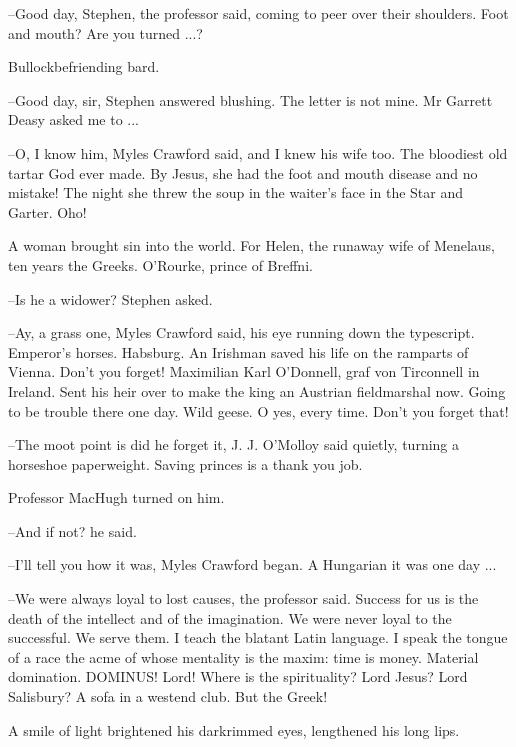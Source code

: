 --Good day, Stephen, the professor said, coming to peer over their
shoulders. Foot and mouth? Are you turned ...?

Bullockbefriending bard.



--Good day, sir, Stephen answered blushing. The letter is not mine. Mr
Garrett Deasy asked me to ...

--O, I know him, Myles Crawford said, and I knew his wife too. The
bloodiest old tartar God ever made. By Jesus, she had the foot and mouth
disease and no mistake! The night she threw the soup in the waiter's face
in the Star and Garter. Oho!

A woman brought sin into the world. For Helen, the runaway wife of
Menelaus, ten years the Greeks. O'Rourke, prince of Breffni.

--Is he a widower? Stephen asked.

--Ay, a grass one, Myles Crawford said, his eye running down the
typescript. Emperor's horses. Habsburg. An Irishman saved his life on the
ramparts of Vienna. Don't you forget! Maximilian Karl O'Donnell, graf
von Tirconnell in Ireland. Sent his heir over to make the king an Austrian
fieldmarshal now. Going to be trouble there one day. Wild geese. O yes,
every time. Don't you forget that!

--The moot point is did he forget it, J. J. O'Molloy said quietly,
turning a horseshoe paperweight. Saving princes is a thank you job.

Professor MacHugh turned on him.

--And if not? he said.

--I'll tell you how it was, Myles Crawford began. A Hungarian it was one
day ...



--We were always loyal to lost causes, the professor said. Success for us
is the death of the intellect and of the imagination. We were never loyal
to the successful. We serve them. I teach the blatant Latin language. I
speak the tongue of a race the acme of whose mentality is the maxim: time
is money. Material domination. DOMINUS! Lord! Where is the spirituality?
Lord Jesus? Lord Salisbury? A sofa in a westend club. But the Greek!



A smile of light brightened his darkrimmed eyes, lengthened his long
lips.

